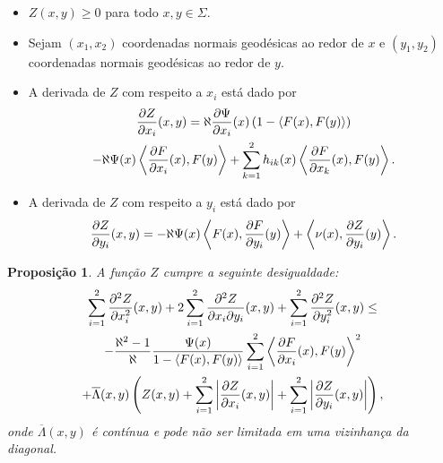 \documentclass[12pt,a4paper]{beamer}
\newtheorem{proposicao}{Proposição}
\theoremstyle{definition}
\begin{document}
\begin{frame}

	\begin{itemize}
		\item $Z(x,y) \geq 0$ para todo $x,y \in \Sigma$.
		
		\pause
		
		\item Sejam $(x_1,x_2)$ coordenadas normais geodésicas ao redor de $x$ e $(y_1,y_2)$ coordenadas normais geodésicas ao redor de $y$.
		
		\pause
		
		\item A derivada de $Z$ com respeito a $x_i$ está dado por
		\begin{multline*}
		\frac{\partial Z}{\partial x_i}(x,y) = \aleph \frac{\partial \Psi}{\partial x_i}(x) \left( 1 - \left\langle F(x),F(y) \right\rangle \right) \\
		-\aleph \Psi(x) \left\langle \frac{\partial F}{\partial x_i}(x),F(y) \right\rangle + \sum_{k=1}^{2} h_{ik}(x) \left\langle \frac{\partial F}{\partial x_k}(x),F(y) \right\rangle.
		\end{multline*}
		
		\pause
		
		\item A derivada de $Z$ com respeito a $y_i$ está dado por
		\begin{equation*}
		\frac{\partial Z}{\partial y_i}(x,y) = -\aleph \Psi(x) \left\langle F(x),\frac{\partial F}{\partial y_i}(y) \right\rangle + \left\langle \nu(x),\frac{\partial Z}{\partial y_i}(y) \right\rangle.
		\end{equation*}
	\end{itemize}
	
\end{frame}
	
\begin{frame}



	\begin{proposicao}\label{sum-2nd-derivative-z-inequality}
		A função $Z$ cumpre a seguinte desigualdade:
		\begin{multline*}
			\sum_{i=1}^{2} \frac{\partial^2 Z}{\partial x_i^2}(x,y) + 2 \sum_{i=1}^{2} \frac{\partial^2 Z}{\partial x_i \partial y_i}(x,y) + \sum_{i=1}^{2} \frac{\partial^2 Z}{\partial y_i^2}(x,y) \leq \\
			- \frac{\aleph^2 -1}{\aleph} \frac{\Psi(x)}{1 - \left\langle F(x),F(y) \right\rangle} \sum_{i=1}^{2} \left\langle \frac{\partial F}{\partial x_i}(x),F(y) \right\rangle^2 \\ 
			+ \overline{\Lambda}(x,y) \left( Z(x,y) + \sum_{i=1}^{2} \left| \frac{\partial Z}{\partial x_i}(x,y) \right| + \sum_{i=1}^{2} \left| \frac{\partial Z}{\partial y_i}(x,y) \right| \right),
		\end{multline*}
		onde $\overline{\Lambda}(x,y)$ é contínua e pode não ser limitada em uma vizinhança da diagonal.
	\end{proposicao}

\end{frame}
\end{document}
